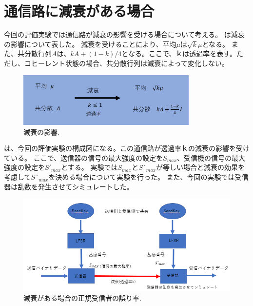 \chapter{通信路に減衰がある場合}
今回の評価実験では通信路が減衰の影響を受ける場合について考える。
は減衰の影響について表した。
減衰を受けることにより、平均$\mu$は$\sqrt{k}\mu$となる。
また、共分散行列$A$は、$kA+ (1-k)/4　$となる。ここで、$ｋ$は透過率を表す。ただし、コヒーレント状態の場合、共分散行列は減衰によって変化しない。


\begin{figure}[htbp]
        \centering   
        \includegraphics[width=0.8\textwidth]{img/zemi6.png}
        \caption[sample image (png)]{減衰の影響.}
        \label{Fig:5_1}
    \end{figure}





は、今回の評価実験の構成図になる。この通信路が透過率$ｋ$の減衰の影響を受けている。
ここで、送信器の信号の最大強度の設定を$S_{max}$、受信機の信号の最大強度の設定を$S'_{max}$とする。
実験では$S_{max}$と$S´_{max}$が等しい場合と減衰の効果を考慮して$S´_{max}$を決める場合について実験を行った。
また、今回の実験では受信器は乱数を発生させてシミュレートした。
\begin{figure}[H]
        \centering   
        \includegraphics[width=1.0\textwidth]{img/zemi7.png}
        \caption[sample image (png)]{減衰がある場合の正規受信者の誤り率.}
        \label{Fig:5_2}
    \end{figure}


